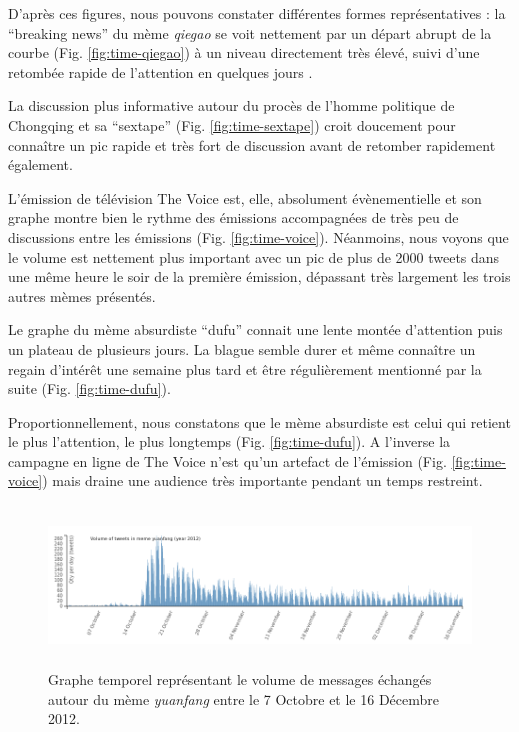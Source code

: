 D{\textquoteright}apr\`es ces figures, nous pouvons constater diff\'erentes formes repr\'esentatives : la {\textquotedblleft}breaking news{\textquotedblright} du m\`eme \textit{qiegao} se voit nettement par un d\'epart abrupt de la courbe (Fig. \ref{fig:time-qiegao}) \`a un niveau directement tr\`es \'elev\'e, suivi d{\textquoteright}une retomb\'ee rapide de l{\textquoteright}attention en quelques jours .  

La discussion plus informative autour du proc\`es de l{\textquoteright}homme politique de Chongqing et sa {\textquotedblleft}sextape{\textquotedblright} (Fig. \ref{fig:time-sextape}) croit doucement pour conna\^itre un pic rapide et tr\`es fort de discussion avant de retomber rapidement \'egalement.  

L{\textquoteright}\'emission de t\'el\'evision The Voice est, elle, absolument \'ev\`enementielle et son graphe montre bien le rythme des \'emissions accompagn\'ees de tr\`es peu de discussions entre les \'emissions (Fig. \ref{fig:time-voice}). N\'eanmoins, nous voyons que le volume est nettement plus important avec un pic de plus de 2000 tweets dans une m\^eme heure le soir de la premi\`ere \'emission, d\'epassant tr\`es largement les trois autres m\`emes pr\'esent\'es.  

Le graphe du m\`eme absurdiste {\textquotedblleft}dufu{\textquotedblright} connait une lente mont\'ee d{\textquoteright}attention puis un plateau de plusieurs jours. La blague semble durer et m\^eme conna\^itre un regain d{\textquoteright}int\'er\^et une semaine plus tard et \^etre r\'eguli\`erement mentionn\'e par la suite (Fig. \ref{fig:time-dufu}).  

Proportionnellement, nous constatons que le m\`eme absurdiste est celui qui retient le plus l{\textquoteright}attention, le plus longtemps (Fig. \ref{fig:time-dufu}). A l{\textquoteright}inverse la campagne en ligne de The Voice n{\textquoteright}est qu{\textquoteright}un artefact de l{\textquoteright}\'emission (Fig. \ref{fig:time-voice}) mais draine une audience tr\`es importante pendant un temps restreint. 

\begin{figure}[ht]
    \centering
    
  \includegraphics[width=6.0087in,height=1.6697in]{figures/chap4/chapitre4-img5.png}
  
  \caption{
   Graphe temporel repr\'esentant le volume de messages \'echang\'es  autour du m\`eme \textit{yuanfang} entre le 7 Octobre et le 16 D\'ecembre 2012.
  }
  \label{fig:time-yuanfang}
\end{figure}

